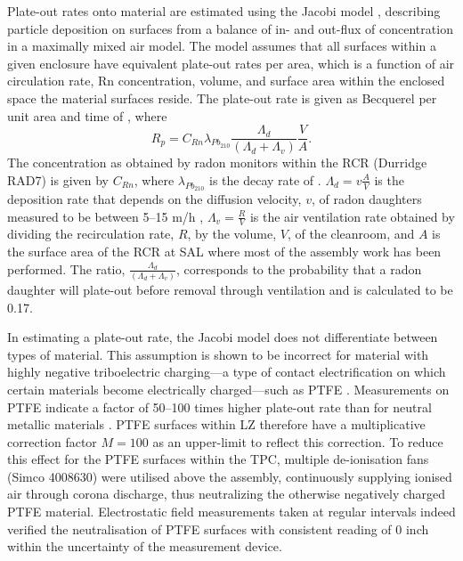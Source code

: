 Plate-out rates onto material are estimated using the Jacobi model \cite{jacobi1972activity, knutson1988modeling}, describing particle deposition on surfaces from a balance of in- and out-flux of concentration in a maximally mixed air model. The model assumes that all surfaces within a given enclosure have equivalent plate-out rates per area, which is a function of air circulation rate, Rn concentration, volume, and surface area within the enclosed space the material surfaces reside. The plate-out rate is given as Becquerel per unit area and time of \PbTOZ{}, where
%
\begin{equation}
    R_p=C_{Rn}\lambda_{Pb_{210}}\frac{\Lambda_d}{(\Lambda_d +\Lambda_v)}\frac{V}{A}.
    \label{eq:jacobi_eq}
\end{equation}
%
The \RnTTT{} concentration as obtained by radon monitors within the RCR (Durridge RAD7) is given by ${C_{Rn}}$, where ${\lambda_{Pb_{210}}}$ is the decay rate of \PbTOZ{}. ${{\Lambda_d =v\frac{A}{V}}}$ is the deposition rate that depends on the diffusion velocity, $v$, of radon daughters measured to be between 5--15 m/h \cite{knutson1988modeling}, ${{\Lambda_v = \frac{R}{V}}}$ is the air ventilation rate obtained by dividing the recirculation rate, $R$, by the volume, $V$, of the cleanroom, and $A$ is the surface area of the RCR at SAL where most of the assembly work has been performed. The ratio, ${\frac{\Lambda_d}{(\Lambda_d +\Lambda_v)}}$, corresponds to the probability that a radon daughter will plate-out before removal through ventilation and is calculated to be 0.17.

In estimating a plate-out rate, the Jacobi model does not differentiate between types of material. This assumption is shown to be incorrect for material with highly negative triboelectric charging---a type of contact electrification on which certain materials become electrically charged---such as PTFE \cite{zou:2019tde}. Measurements on PTFE indicate a factor of 50--100 times higher plate-out rate than for neutral metallic materials \cite{Morrison:2017xul}. PTFE surfaces within LZ therefore have a multiplicative correction factor ${M=100}$ as an upper-limit to reflect this correction. To reduce this effect for the PTFE surfaces within the TPC, multiple de-ionisation fans (Simco 4008630) were utilised above the assembly, continuously supplying ionised air through corona discharge, thus neutralizing the otherwise negatively charged PTFE material. Electrostatic field measurements taken at regular intervals indeed verified the neutralisation of PTFE surfaces with consistent reading of 0 \kilo\volt\per{}inch within the uncertainty of the measurement device.

